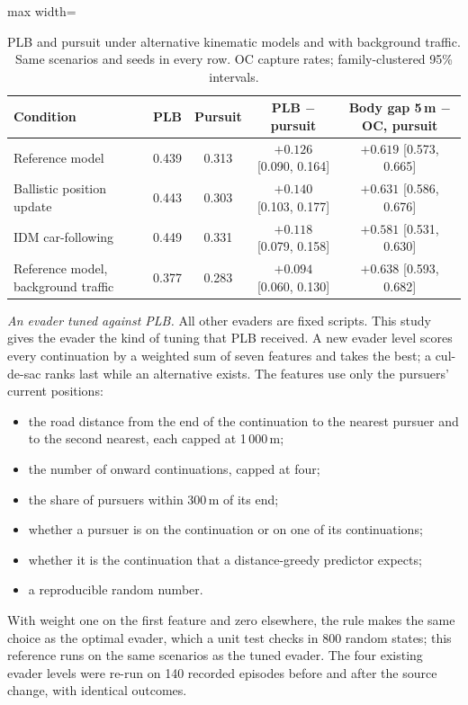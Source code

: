 \documentclass[preprint,12pt]{elsarticle}
\begin{document}
\begin{table}[!h]
\centering
\caption{PLB and pursuit under alternative kinematic models and with background traffic. Same scenarios and seeds in
every row. OC capture rates; family-clustered 95\% intervals.}
\label{tab:s-probes}
\begin{adjustbox}{max width=\textwidth}
\begin{tabular}{@{}lcccc@{}}
\toprule
Condition & PLB & Pursuit & PLB $-$ pursuit & Body gap 5\,m $-$ OC, pursuit \\
\midrule
Reference model & 0.439 & 0.313 & $+0.126$ [0.090, 0.164] & $+0.619$ [0.573, 0.665] \\
Ballistic position update & 0.443 & 0.303 & $+0.140$ [0.103, 0.177] & $+0.631$ [0.586, 0.676] \\
IDM car-following & 0.449 & 0.331 & $+0.118$ [0.079, 0.158] & $+0.581$ [0.531, 0.630] \\
Reference model, background traffic & 0.377 & 0.283 & $+0.094$ [0.060, 0.130] & $+0.638$ [0.593, 0.682] \\
\bottomrule
\end{tabular}
\end{adjustbox}
\end{table}

\emph{An evader tuned against PLB.} All other evaders are fixed scripts. This study gives the evader the kind of tuning
that PLB received. A new evader level scores every continuation by a weighted sum of seven features and takes the
best; a cul-de-sac ranks last while an alternative exists. The features use only the pursuers' current positions:
\begin{itemize}
\item the road distance from the end of the continuation to the nearest pursuer and to the second nearest, each
capped at 1\,000\,m;
\item the number of onward continuations, capped at four;
\item the share of pursuers within 300\,m of its end;
\item whether a pursuer is on the continuation or on one of its continuations;
\item whether it is the continuation that a distance-greedy predictor expects;
\item a reproducible random number.
\end{itemize}
With weight one on the first feature and zero elsewhere, the rule makes the same choice as the optimal evader, which
a unit test checks in 800 random states; this reference runs on the same scenarios as the tuned evader. The four
existing evader levels were re-run on 140 recorded episodes before and after the source change, with identical
outcomes.
\end{document}
